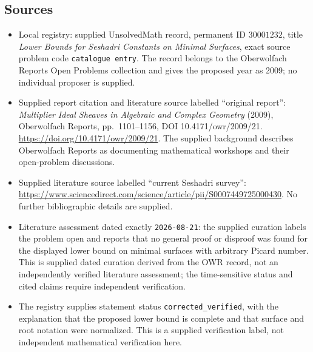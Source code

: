 \documentclass[11pt]{article}
\begin{document}
\subsection{Sources}
\begin{itemize}
\item Local registry: supplied UnsolvedMath record, permanent ID \(30001232\), title \emph{Lower Bounds for Seshadri Constants on Minimal Surfaces}, exact source problem code \texttt{catalogue entry}. The record belongs to the Oberwolfach Reports Open Problems collection and gives the proposed year as 2009; no individual proposer is supplied.
\item Supplied report citation and literature source labelled ``original report'': \emph{Multiplier Ideal Sheaves in Algebraic and Complex Geometry} (2009), Oberwolfach Reports, pp.\ 1101--1156, DOI 10.4171/owr/2009/21. \url{https://doi.org/10.4171/owr/2009/21}. The supplied background describes Oberwolfach Reports as documenting mathematical workshops and their open-problem discussions.
\item Supplied literature source labelled ``current Seshadri survey'': \url{https://www.sciencedirect.com/science/article/pii/S0007449725000430}. No further bibliographic details are supplied.
\item Literature assessment dated exactly \texttt{2026-08-21}: the supplied curation labels the problem open and reports that no general proof or disproof was found for the displayed lower bound on minimal surfaces with arbitrary Picard number. This is supplied dated curation derived from the OWR record, not an independently verified literature assessment; the time-sensitive status and cited claims require independent verification.
\item The registry supplies statement status \texttt{corrected\_verified}, with the explanation that the proposed lower bound is complete and that surface and root notation were normalized. This is a supplied verification label, not independent mathematical verification here.
\end{itemize}
\end{document}
